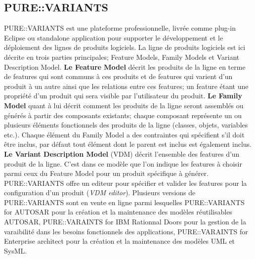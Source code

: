 \subsection{PURE::VARIANTS}
PURE::VARIANTS \cite{PureVariants} est une plateforme professionnelle, livrée comme plug-in Eclipse ou standalone application pour supporter le développement et le déploiement des lignes de produits logiciels. La ligne de produits logiciels est ici décrite en trois parties principales; Feature Models, Family Models et Variant Description Model. \textbf{Le Feature Model} décrit les produits de la ligne en terme de features qui sont communs à ces produits et de features qui varient d'un produit à un autre ainsi que les relations entre ces features; un feature étant une propriété d'un produit qui sera visible par l'utilisateur du produit. \textbf{Le Family Model} quant à lui décrit comment les produits de la ligne seront assemblés ou générés à partir des composants existants; chaque composant représente un ou plusieurs éléments fonctionnels des produits de la ligne (classes, objets, variables etc.). Chaque élément du Family Model a des contraintes qui spécifient s'il doit être inclus, par défaut tout élément dont le parent est inclus est également inclus. \textbf{Le Variant Description Model} (VDM) décrit l'ensemble des features d'un produit de la ligne. C'est dans ce modèle que l'on indique les features à choisir parmi ceux du Feature Model pour un produit spécifique à générer. PURE::VARIANTS offre un editeur pour spécifier et valider les features pour la configuration d'un produit (\textit{VDM editor}). Plusieurs versions de PURE::VARIANTS sont en vente en ligne parmi lesquelles PURE::VARIANTS for AUTOSAR pour la création et la maintenance des modèles réutilisables AUTOSAR, PURE::VARAINTS for IBM Rationnal Doors pour la gestion de la varaibilité dans les besoins fonctionnels des applications, PURE::VARAINTS for Enterprise architect pour la création et la maintenance des modèles UML et SysML.
 
